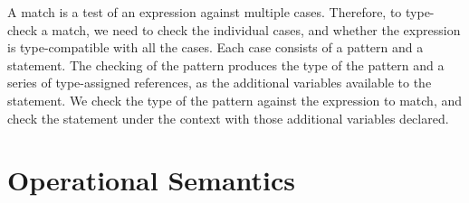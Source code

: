A match is a test of an expression against multiple cases.
Therefore, to type-check a match, we need to check the individual cases, and whether the expression is type-compatible with all the cases.
Each case consists of a pattern and a statement.
The checking of the pattern produces the type of the pattern and a series of type-assigned references, as the additional variables available to the statement.
We check the type of the pattern against the expression to match, and check the statement under the context with those additional variables declared.

\section{Operational Semantics}

\begin{table}[t]
\caption{State Transition Rules}\label{tab:st}
\centering
\normalsize
{}


\end{table}
